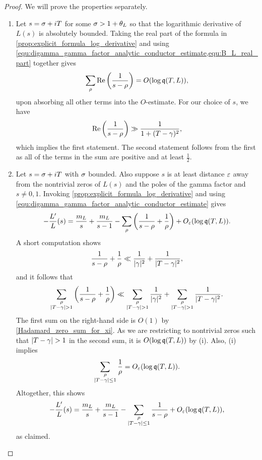     \begin{proof}
      We will prove the properties separately.
      \begin{enumerate}[label*=(\roman*)]
        \item Let \(s = \sigma+iT\) for some \(\sigma > 1+\theta_{L}\) so that the logarithmic derivative of \(L(s)\) is absolutely bounded. Taking the real part of the formula in \cref{prop:explicit_formula_log_derivative} and using \cref{equ:digamma_gamma_factor_analytic_conductor_estimate,equ:B_L_real_part} together gives
        \[
          \sum_{\rho}\mathrm{Re}\left(\frac{1}{s-\rho}\right) = O(\log{\mathfrak{q}(T,L)}),
        \]
        upon absorbing all other terms into the \(O\)-estimate. For our choice of \(s\), we have
        \[
          \mathrm{Re}\left(\frac{1}{s-\rho}\right) \gg \frac{1}{1+(T-\gamma)^{2}},
        \]
        which implies the first statement. The second statement follows from the first as all of the terms in the sum are positive and at least \(\frac{1}{2}\).
        \item Let \(s = \sigma+iT\) with \(\sigma\) bounded. Also suppose \(s\) is at least distance \(\varepsilon\) away from the nontrivial zeros of \(L(s)\) and the poles of the gamma factor and \(s \neq 0,1\). Invoking \cref{prop:explicit_formula_log_derivative} and using \cref{equ:digamma_gamma_factor_analytic_conductor_estimate} gives
        \[
          -\frac{L'}{L}(s) = \frac{m_{L}}{s}+\frac{m_{L}}{s-1}-\sum_{\rho}\left(\frac{1}{s-\rho}+\frac{1}{\rho}\right)+O_{\varepsilon}(\log{\mathfrak{q}(T,L)}).
        \]
        A short computation shows
        \[
          \frac{1}{s-\rho}+\frac{1}{\rho} \ll \frac{1}{|\gamma|^{2}}+\frac{1}{|T-\gamma|^{2}},
        \]
        and it follows that
        \[
          \sum_{\substack{\rho \\ |T-\gamma| > 1}}\left(\frac{1}{s-\rho}+\frac{1}{\rho}\right) \ll \sum_{\substack{\rho \\ |T-\gamma| > 1}}\frac{1}{|\gamma|^{2}}+\sum_{\substack{\rho \\ |T-\gamma| > 1}}\frac{1}{|T-\gamma|^{2}}.
        \]
        The first sum on the right-hand side is \(O(1)\) by \cref{Hadamard_zero_sum_for_xi}. As we are restricting to nontrivial zeros such that \(|T-\gamma| > 1\) in the second sum, it is \(O(\log{\mathfrak{q}(T,L)})\) by (i). Also, (i) implies
        \[
          \sum_{\substack{\rho \\ |T-\gamma| \le 1}}\frac{1}{\rho} = O_{\varepsilon}(\log{\mathfrak{q}(T,L)}).
        \]
        Altogether, this shows
        \[
          -\frac{L'}{L}(s) = \frac{m_{L}}{s}+\frac{m_{L}}{s-1}-\sum_{\substack{\rho \\ |T-\gamma| \le 1}}\frac{1}{s-\rho}+O_{\varepsilon}(\log{\mathfrak{q}(T,L)}),
        \]
        as claimed.  
      \end{enumerate}
    \end{proof}

